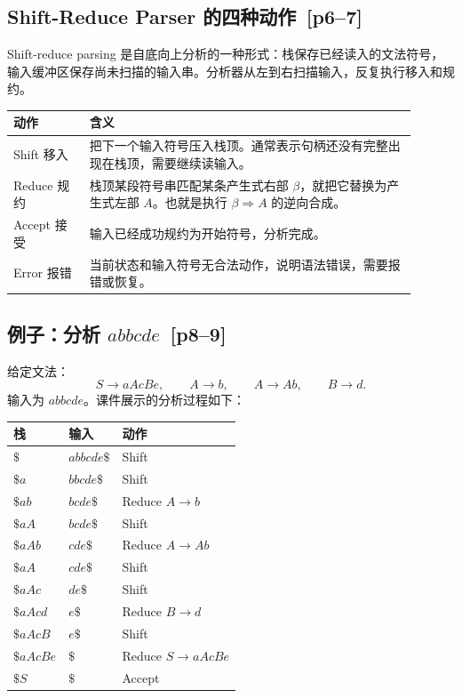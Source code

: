\documentclass[UTF8,fontset=none,11pt]{ctexart}
\newenvironment{defbox}[1][]{%
  \par\medskip\noindent{\color{defrule}\rule{\linewidth}{1.1pt}}\par\nopagebreak
  \noindent{\bfseries\color{defrule}#1}\par\nopagebreak\smallskip}%
  {\par\nopagebreak\smallskip\noindent{\color{defrule}\rule{\linewidth}{0.4pt}}\par\medskip}
\newcommand{\pg}[1]{\texorpdfstring{{\small\color{graytext}\,[p#1]}}{ [p#1]}}
\begin{document}
\subsection{Shift-Reduce Parser 的四种动作 \pg{6--7}}

\begin{defbox}[定义：移入-规约分析]
Shift-reduce parsing 是自底向上分析的一种形式：栈保存已经读入的文法符号，输入缓冲区保存尚未扫描的输入串。分析器从左到右扫描输入，反复执行移入和规约。
\end{defbox}

\begin{longtable}{L{0.17\linewidth}L{0.73\linewidth}}
\toprule
动作 & 含义 \\
\midrule
Shift 移入 & 把下一个输入符号压入栈顶。通常表示句柄还没有完整出现在栈顶，需要继续读输入。\\
Reduce 规约 & 栈顶某段符号串匹配某条产生式右部 \(\beta\)，就把它替换为产生式左部 \(A\)。也就是执行 \(\beta \Rightarrow A\) 的逆向合成。\\
Accept 接受 & 输入已经成功规约为开始符号，分析完成。\\
Error 报错 & 当前状态和输入符号无合法动作，说明语法错误，需要报错或恢复。\\
\bottomrule
\end{longtable}

\subsection{例子：分析 \texorpdfstring{\(abbcde\)}{abbcde} \pg{8--9}}

给定文法：
\[
S\to aAcBe,\qquad A\to b,\qquad A\to Ab,\qquad B\to d.
\]
输入为 \(abbcde\)。课件展示的分析过程如下：

\begin{center}
\small
\begin{tabular}{lll}
\toprule
栈 & 输入 & 动作 \\
\midrule
\(\$\) & \(abbcde\$\) & Shift \\
\(\$a\) & \(bbcde\$\) & Shift \\
\(\$ab\) & \(bcde\$\) & Reduce \(A\to b\) \\
\(\$aA\) & \(bcde\$\) & Shift \\
\(\$aAb\) & \(cde\$\) & Reduce \(A\to Ab\) \\
\(\$aA\) & \(cde\$\) & Shift \\
\(\$aAc\) & \(de\$\) & Shift \\
\(\$aAcd\) & \(e\$\) & Reduce \(B\to d\) \\
\(\$aAcB\) & \(e\$\) & Shift \\
\(\$aAcBe\) & \(\$\) & Reduce \(S\to aAcBe\) \\
\(\$S\) & \(\$\) & Accept \\
\bottomrule
\end{tabular}
\end{center}
\end{document}
